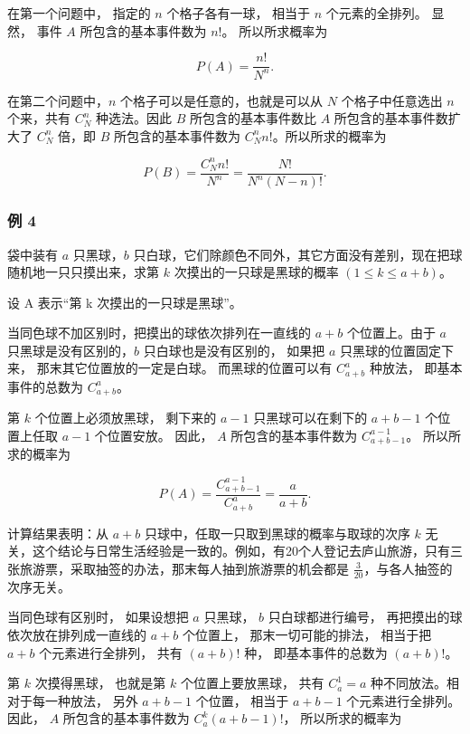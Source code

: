 在第一个问题中， 指定的 \(n\) 个格子各有一球， 相当于 \(n\)
个元素的全排列。 显然， 事件 \(A\) 所包含的基本事件数为 \(n!\)。
所以所求概率为

\[
P (A) = \frac {n !}{N ^ {n}}.
\]

在第二个问题中，\(n\) 个格子可以是任意的，也就是可以从 \(N\)
个格子中任意选出 \(n\) 个来，共有 \(C_N^n\) 种选法。因此 \(B\)
所包含的基本事件数比 \(A\) 所包含的基本事件数扩大了 \(C_N^n\) 倍，即
\(B\) 所包含的基本事件数为 \(C_N^n n!\)。所以所求的概率为

\[
P (B) = \frac {C _ {N} ^ {n} n !}{N ^ {n}} = \frac {N !}{N ^ {n} (N - n) !}.
\]

\subsubsection{例 4}

袋中装有 \(a\) 只黑球，\(b\)
只白球，它们除颜色不同外，其它方面没有差别，现在把球随机地一只只摸出来，求第
\(k\) 次摸出的一只球是黑球的概率 \((1 \leqslant k \leqslant a + b)\)。

设 A 表示``第 k 次摸出的一只球是黑球''。

 当同色球不加区别时，把摸出的球依次排列在一直线的
\(a + b\) 个位置上。由于 \(a\) 只黑球是没有区别的，\(b\)
只白球也是没有区别的， 如果把 \(a\) 只黑球的位置固定下来，
那末其它位置放的一定是白球。 而黑球的位置可以有 \(C_{a+b}^{a}\) 种放法，
即基本事件的总数为 \(C_{a+b}^{a}\)。

第 \(k\) 个位置上必须放黑球， 剩下来的 \(a - 1\) 只黑球可以在剩下的
\(a + b - 1\) 个位置上任取 \(a - 1\) 个位置安放。 因此， \(A\)
所包含的基本事件数为 \(C_{a + b - 1}^{a - 1}\)。 所以所求的概率为

\[
P (A) = \frac {C _ {a + b - 1} ^ {a - 1}}{C _ {a + b} ^ {a}} = \frac {a}{a + b}.
\]

计算结果表明：从 \(a + b\) 只球中，任取一只取到黑球的概率与取球的次序
\(k\)
无关，这个结论与日常生活经验是一致的。例如，有20个人登记去庐山旅游，只有三张旅游票，采取抽签的办法，那末每人抽到旅游票的机会都是
\(\frac{3}{20}\)，与各人抽签的次序无关。


当同色球有区别时， 如果设想把 \(a\) 只黑球， \(b\) 只白球都进行编号，
再把摸出的球依次放在排列成一直线的 \(a + b\) 个位置上，
那末一切可能的排法， 相当于把 \(a + b\) 个元素进行全排列， 共有
\((a + b)!\) 种， 即基本事件的总数为 \((a + b)!\)。

第 \(k\) 次摸得黑球， 也就是第 \(k\) 个位置上要放黑球， 共有 \(C_a^1=a\)
种不同放法。相对于每一种放法， 另外 \(a + b - 1\) 个位置， 相当于
\(a + b - 1\) 个元素进行全排列。因此， \(A\) 所包含的基本事件数为
\(C_{a}^{k}(a + b - 1)!\)， 所以所求的概率为

